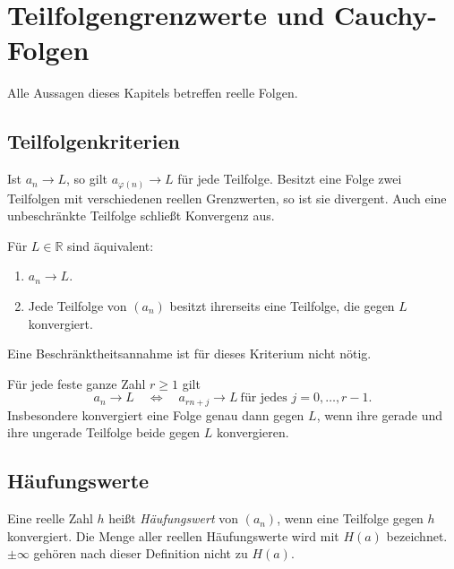 \chapter{Teilfolgengrenzwerte und Cauchy-Folgen}
\label{b21guide:ch:compactness}

Alle Aussagen dieses Kapitels betreffen reelle Folgen.

\section{Teilfolgenkriterien}

\begin{theorem}
\label{b21guide:thm:subsequence-limit}
Ist $a_n\to L$, so gilt $a_{\varphi(n)}\to L$ für jede Teilfolge.
Besitzt eine Folge zwei Teilfolgen mit verschiedenen reellen
Grenzwerten, so ist sie divergent.
Auch eine unbeschränkte Teilfolge schließt Konvergenz aus.
\end{theorem}

\begin{theorem}[Teilteilfolgenkriterium]
\label{b21guide:thm:subsub}
Für $L\in\mathbb R$ sind äquivalent:
\begin{enumerate}
 \item $a_n\to L$.
 \item Jede Teilfolge von $(a_n)$ besitzt ihrerseits eine
 Teilfolge, die gegen $L$ konvergiert.
\end{enumerate}
Eine Beschränktheitsannahme ist für dieses Kriterium nicht nötig.
\end{theorem}

\begin{theorem}
\label{b21guide:thm:residues}
Für jede feste ganze Zahl $r\geq1$ gilt
\[
 a_n\to L
 \quad\Longleftrightarrow\quad
 a_{rn+j}\to L\ \text{für jedes }j=0,\ldots,r-1.
\]
Insbesondere konvergiert eine Folge genau dann gegen $L$,
wenn ihre gerade und ihre ungerade Teilfolge beide gegen $L$
konvergieren.
\end{theorem}

\section{Häufungswerte}

\begin{definition}
\label{b21guide:def:cluster}
Eine reelle Zahl $h$ heißt \emph{Häufungswert} von $(a_n)$,
wenn eine Teilfolge gegen $h$ konvergiert.
Die Menge aller reellen Häufungswerte wird mit $H(a)$ bezeichnet.
$\pm\infty$ gehören nach dieser Definition nicht zu $H(a)$.
\end{definition}

